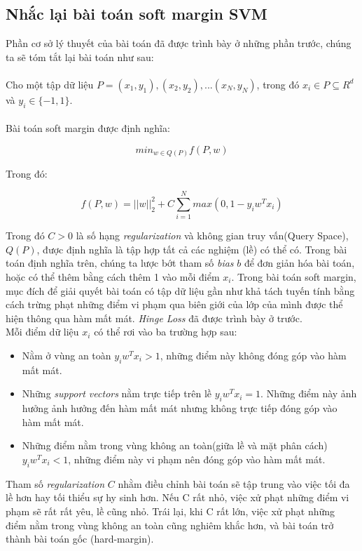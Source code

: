 \documentclass[a4paper, 12pt, oneside]{report}
\begin{document}
\subsection{Nhắc lại bài toán soft margin SVM}
Phần cơ sở lý thuyết của bài toán đã được trình bày ở những phần trước, chúng ta sẽ tóm tắt lại bài toán như sau:\\ \\
Cho một tập dữ liệu $P = {(x_1,y_1),(x_2,y_2),...(x_N,y_N)}$, trong đó $x_i \in P \subseteq R^d $ và $y_i \in \{-1,1\}$.\\ \\
Bài toán soft margin được định nghĩa: 
\begin{mybox}
$$ min_{w\in Q(P)} f(P,w)$$
\end{mybox}
Trong đó: 
\begin{mybox}
$$f(P,w) = ||w||^2_2 + C\sum_{i=1}^{N}{max(0, 1-y_iw^Tx_i)}$$  
\end{mybox}
Trong đó $C > 0$ là số hạng \textit{regularization} và không gian truy vấn(Query Space), $Q(P)$, được định nghĩa là tập hợp tất cả các nghiệm (lề) có thể có. Trong bài toán định nghĩa trên, chúng ta lược bớt tham số \textit{bias} $b$ để đơn giản hóa bài toán, hoặc có thể thêm bằng cách thêm 1 vào mỗi điểm $x_i$. Trong bài toán soft margin, mục đích để giải quyết bài toán có tập dữ liệu gần như khả tách tuyến tính bằng cách trừng phạt những điểm vi phạm qua biên giới của lớp của mình được thể hiện thông qua hàm mất mát. \textit{Hinge Loss} đã được trình bày ở trước. \\
Mỗi điểm dữ liệu $x_i$ có thể rơi vào ba trường hợp sau:
\begin{itemize}
    \item Nằm ở vùng an toàn $y_iw^Tx_i>1$, những điểm này không đóng góp vào hàm mất mát. 
    \item Những \textit{support vectors} nằm trực tiếp trên lề $y_iw^Tx_i = 1$. Những điểm này ảnh hưởng ảnh hưởng đến hàm mất mát nhưng không trực tiếp đóng góp vào hàm mất mát.
    \item Những điểm nằm trong vùng không an toàn(giữa lề và mặt phân cách) $y_iw^Tx_i <1$, những điểm này vi phạm nên đóng góp vào hàm mất mát. 
\end{itemize}
Tham số \textit{regularization} $C$  nhằm điều chỉnh bài toán sẽ tập trung vào việc tối đa lề hơn hay tối thiểu sự hy sinh hơn. Nếu C rất nhỏ, việc xử phạt những điểm vi phạm sẽ rất rất yêu, lề cũng nhỏ. Trái lại, khi C rất lớn, việc xử phạt những điểm nằm trong vùng không an toàn cũng nghiêm khắc hơn, và bài toán trở thành bài toán gốc (hard-margin).
\end{document}
